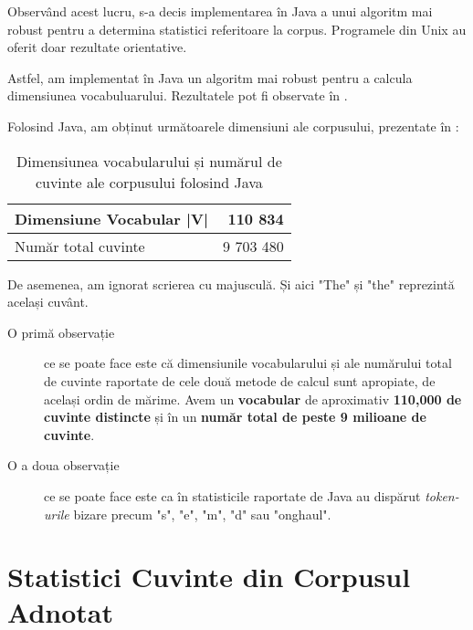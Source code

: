 Observând acest lucru, s-a decis implementarea în Java a unui algoritm mai robust pentru a determina statistici referitoare la corpus. Programele din Unix au oferit doar rezultate orientative.

Astfel, am implementat în Java un algoritm mai robust pentru a calcula dimensiunea vocabuluarului. Rezultatele pot fi observate în .

Folosind Java, am obținut următoarele dimensiuni ale corpusului, prezentate în :

\begin{center}
\begin{table}[htb]
  \caption{Dimensiunea vocabularului și numărul de cuvinte ale corpusului folosind Java}
  \begin{tabular}{|l|r|}
    \hline
    Dimensiune Vocabular |V| & 110 834\\
    \hline
    Număr total cuvinte & 9 703 480 \\
     \hline
  \end{tabular}
  \label{table:vocabulary-size-java}
\end{table}
\end{center}

\lstset{language=make}
\lstset{caption=Cele mai folosite cuvinte din limba engleză pentru corpusul obținut folosind Java, label=lst:top-words-java}


De asemenea, am ignorat scrierea cu majusculă. Și aici "The" și "the" reprezintă același cuvânt.

\begin{description}
	\item[O primă observație] ce se poate face este că dimensiunile vocabularului și ale numărului total de cuvinte raportate de cele două metode de calcul sunt apropiate, de același ordin de mărime. Avem un \textbf{vocabular} de aproximativ \textbf{110,000 de cuvinte distincte} și în un\textbf{ număr total de peste 9 milioane de cuvinte}.
	\item [O a doua observație] ce se poate face este ca în statisticile raportate de Java au dispărut \textit{token-urile} bizare precum "s", "e", "m", "d" sau "onghaul".
\end{description}

\section{Statistici Cuvinte din Corpusul Adnotat}

